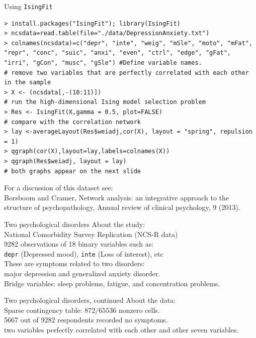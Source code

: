 \documentclass[11pt,handout,aspectratio=169,dvipsnames]{beamer}
\begin{document}
\begin{frame}[fragile,label=DepAnx]{Using \texttt{IsingFit}}
	\begin{lstlisting}
> install.packages("IsingFit"); library(IsingFit)
> ncsdata=read.table(file="./data/DepressionAnxiety.txt") 
> colnames(ncsdata)=c("depr", "inte", "weig", "mSle", "moto", "mFat", "repr", "conc", "suic", "anxi", "even", "ctrl", "edge", "gFat", "irri", "gCon", "musc", "gSle") #Define variable names.
# remove two variables that are perfectly correlated with each other in the sample
> X <- (ncsdata[,-(10:11)])
# run the high-dimensional Ising model selection problem
> Res <- IsingFit(X,gamma = 0.5, plot=FALSE)
# compare with the correlation network
> lay <-averageLayout(Res$weiadj,cor(X), layout = "spring", repulsion = 1)
> qgraph(cor(X),layout=lay,labels=colnames(X))
> qgraph(Res$weiadj, layout = lay)
# both graphs appear on the next slide
\end{lstlisting}
For a discussion of this dataset see:\\[.2cm]
{\footnotesize Borsboom and Cramer, Network analysis: an integrative approach to the\\[-.2cm] structure of psychopathology, Annual review of clinical psychology, 9 (2013). }
\end{frame}


\begin{frame}{Two psychological disorders}
\alert{About the study:}\\[.5cm]
National Comorbidity Survey Replication  (NCS-R data)\\[.4cm]
9282 observations of 18 binary variables such as:\\
\texttt{depr} (Depressed mood), \texttt{inte} (Loss of interest), etc\\[.4cm]
These are symptoms related to two disorders:\\ major depression and generalized anxiety disorder.\\[.4cm]
Bridge variables: sleep problems, fatigue, and concentration problems.

\end{frame}


\begin{frame}{Two psychological disorders, continued}
\alert{About the data:}\\[.5cm]
Sparse contingency table: $872/65536$ nonzero cells. \\[.4cm]
5667 out of 9282 respondents recorded no symptoms.\\[.4cm]
two variables perfectly correlated with each other and other seven variables.\\[.4cm]
\end{frame}
\end{document}
